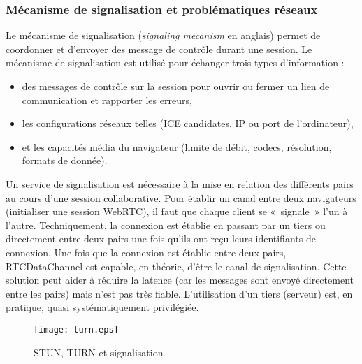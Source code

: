 \subsubsection{Mécanisme de signalisation et problématiques réseaux}
Le mécanisme de signalisation (\textit{signaling mecanism} en anglais) 
permet de coordonner et d'envoyer des message de contrôle durant une 
session. Le mécanisme de signalisation est utilisé pour échanger trois 
types d'information : 
\begin{itemize}
	\item des messages de contrôle sur la session pour ouvrir ou fermer un 
	lien de communication et rapporter les erreurs,
	\item les configurations réseaux telles (ICE candidates, IP ou
	port de l'ordinateur), 
	\item et les capacités média du navigateur (limite de débit, codecs, 
	résolution, formats de donnée). 
\end{itemize}
Un service de signalisation est nécessaire à la mise en relation des 
différents pairs au cours d'une session collaborative. 
Pour établir un canal entre deux navigateurs (initialiser une session 
WebRTC), il faut que chaque client se «~signale~» l'un à l'autre. 
Techniquement, la connexion est établie en passant par 
un tiers ou directement entre deux pairs une fois qu'ils ont reçu leurs 
identifiants de connexion. 
Une fois que la connexion est établie entre deux pairs, 
RTCDataChannel est capable, en théorie, d'être le canal de signalisation. 
Cette solution peut aider à réduire la latence (car les messages sont 
envoyé directement entre les pairs) mais n'est pas très fiable. L'utilisation 
d'un tiers (serveur) est, en pratique, quasi systématiquement privilégiée.

\begin{figure}[hbt]
	\centering
	\texttt{[image: turn.eps]}
	\caption{STUN, TURN et signalisation}
	\label{fig:turn}
\end{figure} 

